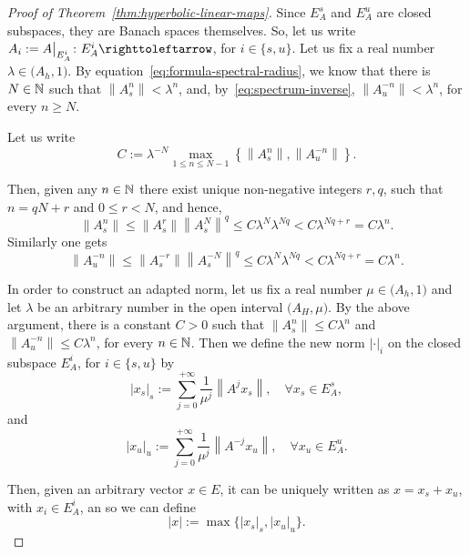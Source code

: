 \documentclass{article}
\newcommand{\abs}[1]{\left\lvert{#1}\right\rvert}
\newcommand{\norm}[1]{\left\|{#1}\right\|}
\begin{document}
\begin{proof}[Proof of Theorem~\ref{thm:hyperbolic-linear-maps}]
 Since $E^{s}_{A}$ and $E^{u}_{A}$ are closed subspaces, they are Banach spaces themselves. So, let us write $A_{i}:=A\big|_{E^{i}_{A}}\colon E^{i}_{A}\carr$, for $i\in\{s,u\}$. Let us fix a real number $\lambda\in \big(A_{h},1)$. By equation~\eqref{eq:formula-spectral-radius}, we know that there is $N\in\mathbb{N}$ such that $\norm{A^{n}_{s}}<\lambda^{n}$, and, by~\eqref{eq:spectrum-inverse}, $\norm{A_{u}^{-n}}<\lambda^{n}$, for every $n\geq N$.

 Let us write
 \begin{displaymath}
   C:=\lambda^{-N}\max_{1\leq n\leq N-1}\left\{\norm{A_{s}^{n}}, \norm{A_{u}^{-n}}\right\}.
 \end{displaymath}

 Then, given any $n\in\mathbb{N}$ there exist unique non-negative integers $r,q$, such that  $n=qN+r$ and $0\leq r<N$, and hence,
 \begin{displaymath}
   \norm{A_{s}^{n}}\leq \norm{A_{s}^{r}} \norm{A_{s}^{N}}^{q} \leq C\lambda^{N}\lambda^{Nq}< C\lambda^{Nq+r}=C\lambda^{n}.
 \end{displaymath}
 Similarly one gets
 \begin{displaymath}
   \norm{A_{u}^{-n}}\leq \norm{A_{s}^{-r}} \norm{A_{s}^{-N}}^{q} \leq C\lambda^{N}\lambda^{Nq}< C\lambda^{Nq+r}=C\lambda^{n}.
 \end{displaymath}

 In order to construct an adapted norm, let us fix a real number $\mu\in \big(A_{h},1)$ and let $\lambda$ be an arbitrary number in the open interval $\big(A_{H},\mu\big)$. By the above argument, there is a constant $C>0$ such that $\norm{A_{s}^{n}}\leq C\lambda^{n}$ and $\norm{A_{u}^{-n}}\leq C\lambda^{n}$, for every $n\in\mathbb{N}$. Then we define the new norm $\abs{\cdot}_{i}$ on the closed subspace $E_{A}^{i}$, for $i\in\{s,u\}$ by
 \begin{displaymath}
   \abs{x_{s}}_{s}:=\sum_{j=0}^{+\infty} \frac{1}{\mu^{j}}\norm{A^{j}x_{s}}, \quad\forall x_{s}\in E_{A}^{s},
 \end{displaymath}
 and
 \begin{displaymath}
   \abs{x_{u}}_{u}:=\sum_{j=0}^{+\infty} \frac{1}{\mu^{j}}\norm{A^{-j}x_{u}}, \quad\forall x_{u}\in E_{A}^{u}.
 \end{displaymath}

 Then, given an arbitrary vector $x\in E$, it can be uniquely written as $x=x_{s}+x_{u}$, with $x_{i}\in E_{A}^{i}$, an so we can define
 \begin{displaymath}
   \abs{x}:=\max\{\abs{x_{s}}_{s},\abs{x_{u}}_{u}\}.
 \end{displaymath}


\end{proof}
\end{document}
